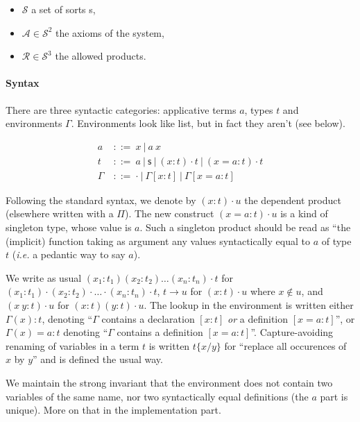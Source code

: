 \documentclass[12pt]{article}
\newcommand{\sort}{\textsf{s}}
\newcommand{\gor}{\ |\ }
\newcommand{\gdecl}[2]{{#1}\ &::=\ {#2}}
\newcommand{\subst}[2]{\{#1/#2\}}
\begin{document}
\begin{itemize}
  \item$\mathcal S$ a set of sorts \sort,
  \item$\mathcal A \in \mathcal S^2$ the axioms of the system,
  \item$\mathcal R \in \mathcal S^3$ the allowed products.
\end{itemize}

\paragraph{Syntax} There are three syntactic categories: applicative
terms $a$, types $t$ and environments $\Gamma$. Environments look like
list, but in fact they aren't (see below).

\begin{align*}
 \gdecl{a}{x \gor a\ x } \\
 \gdecl{t}{a \gor \sort \gor (x:t)\cdot t \gor (x=a:t)\cdot t} \\
 \gdecl{\Gamma}{\cdot \gor \Gamma[x:t] \gor \Gamma[x=a:t]}
\end{align*}

Following the standard syntax, we denote by $(x:t)\cdot u$ the
dependent product (elsewhere written with a $\Pi$). The new construct
$(x=a:t)\cdot u$ is a kind of singleton type, whose value is $a$. Such
a singleton product should be read as ``the (implicit) function taking
as argument any values syntactically equal to $a$ of type $t$
(\emph{i.e.} a pedantic way to say $a$). 

We write as usual $(x_1:t_1)(x_2:t_2)\ldots(x_n:t_n)\cdot t$ for
$(x_1:t_1)\cdot(x_2:t_2)\cdot\ldots\cdot(x_n:t_n)\cdot t$, $t \to
u$ for $(x:t)\cdot u$ where $x\notin u$, and $(x\ y : t)\cdot u$ for
$(x:t)(y:t)\cdot u$. The lookup in the environment
is written either $\Gamma(x):t$, denoting ``$\Gamma$ contains a
declaration $[x:t]$ \emph{or} a definition $[x=a:t]$'', or
$\Gamma(x)=a:t$ denoting ``$\Gamma$ contains a definition
$[x=a:t]$''. Capture-avoiding renaming of variables in a term $t$ is
written $t\subst{x}{y}$ for ``replace all occurences of $x$ by $y$''
and is defined the usual way.

We maintain the strong invariant that the environment does not contain
two variables of the same name, nor two syntactically equal
definitions (the $a$ part is unique). More on that in the
implementation part.
\end{document}
